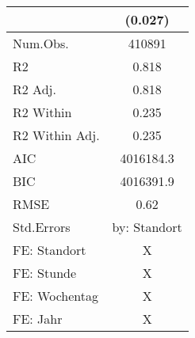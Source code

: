 \begin{table}
\begin{tabular}[t]{lc}
 & (\num{0.027})\\
\midrule
Num.Obs. & \num{410891}\\
R2 & \num{0.818}\\
R2 Adj. & \num{0.818}\\
R2 Within & \num{0.235}\\
R2 Within Adj. & \num{0.235}\\
AIC & \num{4016184.3}\\
BIC & \num{4016391.9}\\
RMSE & \num{0.62}\\
Std.Errors & by: Standort\\
FE: Standort & X\\
FE: Stunde & X\\
FE: Wochentag & X\\
FE: Jahr & X\\
\bottomrule
\end{tabular}
\end{table}
